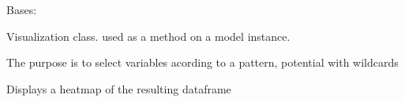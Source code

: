 \documentclass[letterpaper,10pt,english]{sphinxmanual}
\begin{document}
\begin{fulllineitems}
\label{\detokenize{vis/modelvis:modelvis.vis}}
\pysigstartsignatures
{}
\pysigstopsignatures
\sphinxAtStartPar
Bases: 

\sphinxAtStartPar
Visualization class. used as a method on a model instance.

\sphinxAtStartPar
The purpose is to select variables acording to a pattern, potential with wildcards

\begin{fulllineitems}
\label{\detokenize{vis/modelvis:modelvis.vis.explain}}
\pysigstartsignatures
{}
\pysigstopsignatures
\end{fulllineitems}


\begin{fulllineitems}
\label{\detokenize{vis/modelvis:modelvis.vis.draw}}
\pysigstartsignatures
{}
\pysigstopsignatures
\end{fulllineitems}


\begin{fulllineitems}
\label{\detokenize{vis/modelvis:modelvis.vis.dekomp}}
\pysigstartsignatures
{}
\pysigstopsignatures
\end{fulllineitems}


\begin{fulllineitems}
\label{\detokenize{vis/modelvis:modelvis.vis.heat}}
\pysigstartsignatures
{}
\pysigstopsignatures
\sphinxAtStartPar
Displays a heatmap of the resulting dataframe


\end{fulllineitems}
\end{fulllineitems}
\end{document}
